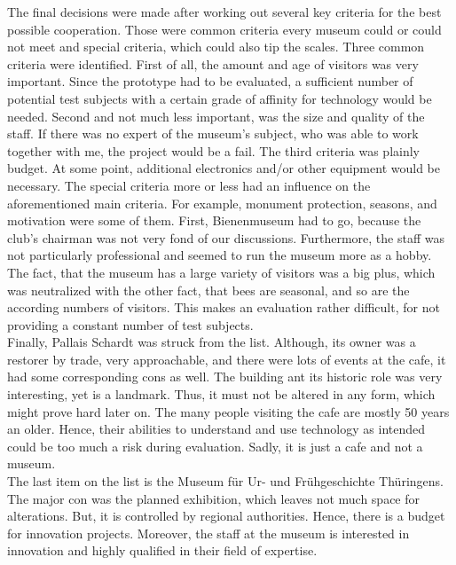 The final decisions were made after working out several key criteria for the best possible cooperation. Those were common criteria every museum could or could not meet and special criteria, which could also tip the scales. Three common criteria were identified. First of all, the amount and age of visitors was very important. Since the prototype had to be evaluated, a sufficient number of potential test subjects with a certain grade of affinity for technology would be needed. Second and not much less important, was the size and quality of the staff. If there was no expert of the museum's subject, who was able to work together with me, the project would be a fail. The third criteria was plainly budget. At some point, additional electronics and/or other equipment would be necessary. The special criteria more or less had an influence on the aforementioned main criteria. For example, monument protection, seasons, and motivation were some of them. First, Bienenmuseum had to go, because the club's chairman was not very fond of our discussions. Furthermore, the staff was not particularly professional and seemed to run the museum more as a hobby. The fact, that the museum has a large variety of visitors was a big plus, which was neutralized with the other fact, that bees are seasonal, and so are the according numbers of visitors. This makes an evaluation rather difficult, for not providing a constant number of test subjects.
\\
Finally, Pallais Schardt was struck from the list. Although, its owner was a restorer by trade, very approachable, and there were lots of events at the cafe, it had some corresponding cons as well. The building ant its historic role was very interesting, yet is a landmark. Thus, it must not be altered in any form, which might prove hard later on. The many people visiting the cafe are mostly 50 years an older. Hence, their abilities to understand and use technology as intended could be too much a risk during evaluation. Sadly, it is just a cafe and not a museum.
\\
The last item on the list is the Museum für Ur- und Frühgeschichte Thüringens. The major con was the planned exhibition, which leaves not much space for alterations. But, it is controlled by regional authorities. Hence, there is a budget for innovation projects. Moreover, the staff at the museum is interested in innovation and highly qualified in their field of expertise.
